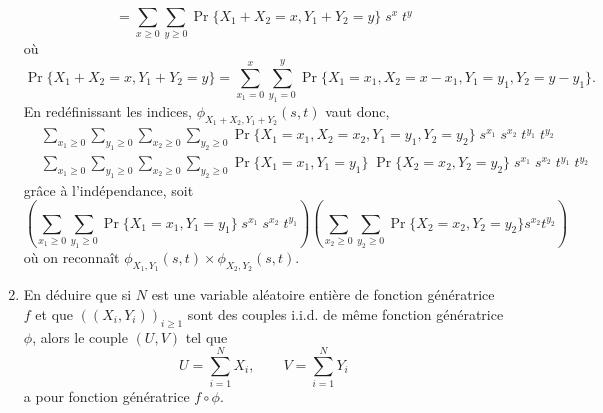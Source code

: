 \begin{enumerate}
{$$  =
  \sum_{x \geq 0} \sum_{y \geq 0} \Pr\{X_1+X_2=x, Y_1+Y_2=y\} \; s^x \; t^y
  $$
  où
  $$
  \Pr\{X_1+X_2=x, Y_1+Y_2=y\} 
  =
  \sum_{x_1=0}^x \sum_{y_1=0}^y \Pr\{X_1=x_1, X_2=x-x_1, Y_1=y_1, Y_2=y-y_1\}.
  $$
  En redéfinissant les indices, $\phi_{X_1+X_2, Y_1+Y_2}(s, t)$ vaut donc, 
  \begin{align*}
  & \sum_{x_1 \geq 0} \sum_{y_1 \geq 0} \sum_{x_2 \geq 0} \sum_{y_2 \geq 0} \Pr\{X_1=x_1, X_2=x_2, Y_1=y_1, Y_2=y_2\} \; s^{x_1} \; s^{x_2} \; t^{y_1} \; t^{y_2} \\ 
  & \sum_{x_1 \geq 0} \sum_{y_1 \geq 0} \sum_{x_2 \geq 0} \sum_{y_2 \geq 0} \Pr\{X_1=x_1, Y_1=y_1\} \; \Pr\{X_2=x_2, Y_2=y_2\} \; s^{x_1} \; s^{x_2} \; t^{y_1} \; t^{y_2} 
  \end{align*}
  grâce à l'indépendance, soit
  $$
  \left(\sum_{x_1 \geq 0} \sum_{y_1 \geq 0}\Pr\{X_1=x_1, Y_1=y_1\} \; s^{x_1} \; s^{x_2} \; t^{y_1}\right) \left(\sum_{x_2 \geq 0} \sum_{y_2 \geq 0} \Pr\{X_2=x_2, Y_2=y_2\} s^{x_2} t^{y_2}\right)
  $$
  où on reconnaît $\phi_{X_1, Y_1}(s, t) \times \phi_{X_2, Y_2}(s, t)$.
  }   
  \item En déduire que si $N$ est une variable aléatoire entière de fonction génératrice $f$ et que $((X_i, Y_i))_{i \geq 1}$ sont des couples i.i.d. de même fonction génératrice $\phi$, alors le couple $(U, V)$ tel que
  $$
  U = \sum_{i=1}^N X_i, \qquad V = \sum_{i=1}^N Y_i
  $$
  a pour fonction génératrice $f \circ \phi$.
  \solution{\todo{}}   
\end{enumerate}

